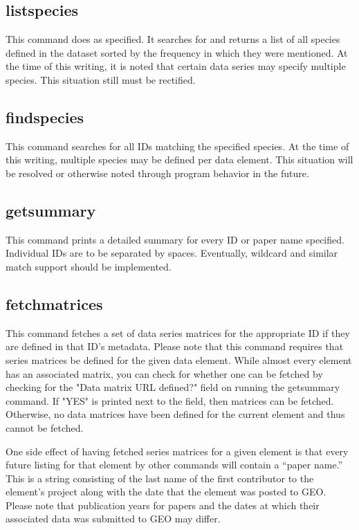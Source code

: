 \documentclass[12pt,letterpaper]{article}
\begin{document}
\subsection{listspecies}
This command does as specified. It searches for and returns a list of all species defined in the dataset sorted by the frequency in which they were mentioned.
At the time of this writing, it is noted that certain data series may specify multiple species. This situation still must be rectified.

\subsection{findspecies}
This command searches for all IDs matching the specified species. At the time of this writing, multiple species may be defined per data element. This situation 
will be resolved or otherwise noted through program behavior in the future.

\subsection{getsummary}
This command prints a detailed summary for every ID or paper name specified. Individual IDs are to be separated by spaces. Eventually, wildcard and similar
match support should be implemented.

\subsection{fetchmatrices}
This command fetches a set of data series matrices for the appropriate ID if they are defined in that ID's metadata. Please note that this command requires that series matrices
be defined for the given data element. While almost every element has an associated matrix, you can check for whether one can be fetched by checking for the "Data matrix URL defined?"
field on running the getsummary command. If "YES" is printed next to the field, then matrices can be fetched. Otherwise, no data matrices have been defined for the current element
and thus cannot be fetched.

One side effect of having fetched series matrices for a given element is that every future listing for that element by other commands will contain a ``paper name.''
This is a string consisting of the last name of the first contributor to the element's project along with the date that the element was posted to GEO. Please
note that publication years for papers and the dates at which their associated data was submitted to GEO may differ.
\end{document}
